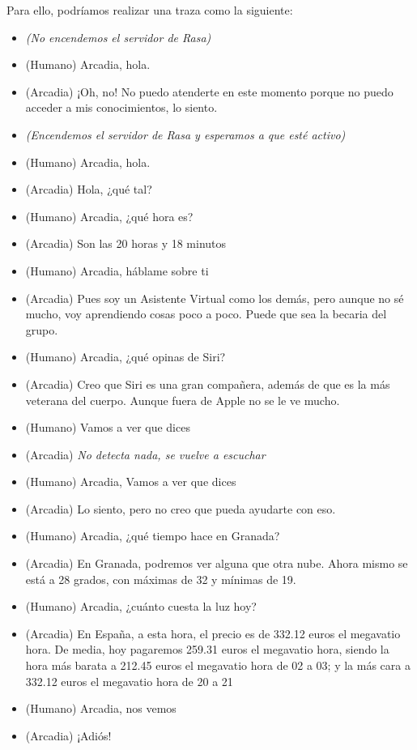 Para ello, podríamos realizar una traza como la siguiente:


\begin{itemize}
	\item \textit{(No encendemos el servidor de Rasa)}
	\item (Humano) Arcadia, hola.
	\item (Arcadia) ¡Oh, no! No puedo atenderte en este momento porque no puedo acceder a mis conocimientos, lo siento.
	\item \textit{(Encendemos el servidor de Rasa y esperamos a que esté activo)}
	\item (Humano) Arcadia, hola.
	\item (Arcadia) Hola, ¿qué tal?
	\item (Humano) Arcadia, ¿qué hora es?
	\item (Arcadia) Son las 20 horas y 18 minutos
	\item (Humano) Arcadia, háblame sobre ti
	\item (Arcadia) Pues soy un Asistente Virtual como los demás, pero aunque no sé mucho, voy aprendiendo cosas poco a poco. Puede que sea la becaria del grupo.
	\item (Humano) Arcadia, ¿qué opinas de Siri?
	\item (Arcadia) Creo que Siri es una gran compañera, además de que es la más veterana del cuerpo. Aunque fuera de Apple no se le ve mucho.
	\item (Humano) Vamos a ver que dices
	\item (Arcadia) \textit{No detecta nada, se vuelve a escuchar}
	\item (Humano) Arcadia, Vamos a ver que dices
	\item (Arcadia) Lo siento, pero no creo que pueda ayudarte con eso.
	\item (Humano) Arcadia, ¿qué tiempo hace en Granada?
	\item (Arcadia) En Granada, podremos ver alguna que otra nube. Ahora mismo se está a 28 grados,	con máximas de 32 y mínimas de 19.
	\item (Humano) Arcadia, ¿cuánto cuesta la luz hoy?
	\item (Arcadia) En España, a esta hora, el precio es de 332.12 euros el megavatio hora. De media, hoy pagaremos 259.31 euros el megavatio hora, siendo la hora más barata a 212.45 euros el megavatio hora de 02 a 03; y la más cara a 332.12 euros el megavatio hora de 20 a 21
	\item (Humano) Arcadia, nos vemos
	\item (Arcadia) ¡Adiós!
\end{itemize}

